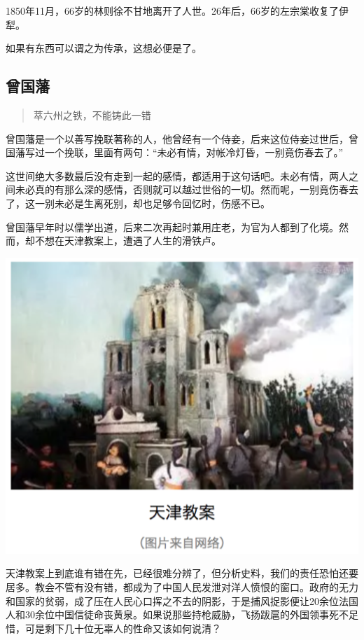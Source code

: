 \documentclass[]{book}
\begin{document}
1850年11月，66岁的林则徐不甘地离开了人世。26年后，66岁的左宗棠收复了伊犁。

如果有东西可以谓之为传承，这想必便是了。

\subsection{曾国藩}

\begin{quote}
萃六州之铁，不能铸此一错
\end{quote}

曾国藩是一个以善写挽联著称的人，他曾经有一个侍妾，后来这位侍妾过世后，曾国藩写过一个挽联，里面有两句：``未必有情，对帐冷灯昏，一别竟伤春去了。''

这世间绝大多数最后没有走到一起的感情，都适用于这句话吧。未必有情，两人之间未必真的有那么深的感情，否则就可以越过世俗的一切。然而呢，一别竟伤春去了，这一别未必是生离死别，却也足够令回忆时，伤感不已。

曾国藩早年时以儒学出道，后来二次再起时兼用庄老，为官为人都到了化境。然而，却不想在天津教案上，遭遇了人生的滑铁卢。

\includegraphics[width=6.67in]{images/his3}

天津教案上到底谁有错在先，已经很难分辨了，但分析史料，我们的责任恐怕还要居多。教会不管有没有错，都成为了中国人民发泄对洋人愤恨的窗口。政府的无力和国家的贫弱，成了压在人民心口挥之不去的阴影，于是捕风捉影便让20余位法国人和30余位中国信徒命丧黄泉。如果说那些持枪威胁，飞扬跋扈的外国领事死不足惜，可是剩下几十位无辜人的性命又该如何说清？
\end{document}
